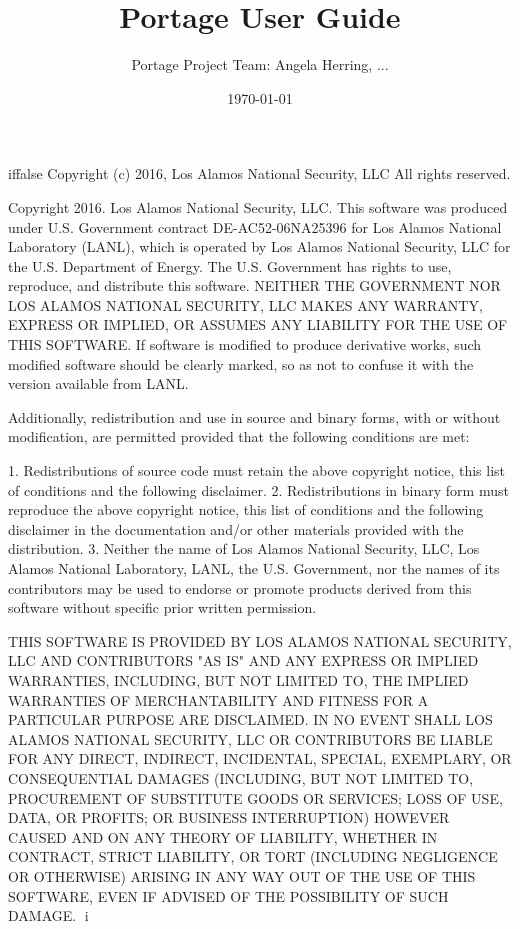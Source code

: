 iffalse
Copyright (c) 2016, Los Alamos National Security, LLC
All rights reserved.

Copyright 2016. Los Alamos National Security, LLC. This software was produced
under U.S. Government contract DE-AC52-06NA25396 for Los Alamos National
Laboratory (LANL), which is operated by Los Alamos National Security, LLC for
the U.S. Department of Energy. The U.S. Government has rights to use,
reproduce, and distribute this software.  NEITHER THE GOVERNMENT NOR LOS ALAMOS
NATIONAL SECURITY, LLC MAKES ANY WARRANTY, EXPRESS OR IMPLIED, OR ASSUMES ANY
LIABILITY FOR THE USE OF THIS SOFTWARE.  If software is modified to produce
derivative works, such modified software should be clearly marked, so as not to
confuse it with the version available from LANL.

Additionally, redistribution and use in source and binary forms, with or
without modification, are permitted provided that the following conditions are
met:

1. Redistributions of source code must retain the above copyright notice,
   this list of conditions and the following disclaimer.
2. Redistributions in binary form must reproduce the above copyright
   notice, this list of conditions and the following disclaimer in the
   documentation and/or other materials provided with the distribution.
3. Neither the name of Los Alamos National Security, LLC, Los Alamos
   National Laboratory, LANL, the U.S. Government, nor the names of its
   contributors may be used to endorse or promote products derived from this
   software without specific prior written permission.

THIS SOFTWARE IS PROVIDED BY LOS ALAMOS NATIONAL SECURITY, LLC AND
CONTRIBUTORS "AS IS" AND ANY EXPRESS OR IMPLIED WARRANTIES, INCLUDING, BUT NOT
LIMITED TO, THE IMPLIED WARRANTIES OF MERCHANTABILITY AND FITNESS FOR A
PARTICULAR PURPOSE ARE DISCLAIMED. IN NO EVENT SHALL LOS ALAMOS NATIONAL
SECURITY, LLC OR CONTRIBUTORS BE LIABLE FOR ANY DIRECT, INDIRECT, INCIDENTAL,
SPECIAL, EXEMPLARY, OR CONSEQUENTIAL DAMAGES (INCLUDING, BUT NOT LIMITED TO,
PROCUREMENT OF SUBSTITUTE GOODS OR SERVICES; LOSS OF USE, DATA, OR PROFITS; OR
BUSINESS INTERRUPTION) HOWEVER CAUSED AND ON ANY THEORY OF LIABILITY, WHETHER
IN CONTRACT, STRICT LIABILITY, OR TORT (INCLUDING NEGLIGENCE OR OTHERWISE)
ARISING IN ANY WAY OUT OF THE USE OF THIS SOFTWARE, EVEN IF ADVISED OF THE
POSSIBILITY OF SUCH DAMAGE.
i


\title{Portage User Guide}
\date{\today}
\author{Portage Project Team: Angela Herring, ...}

